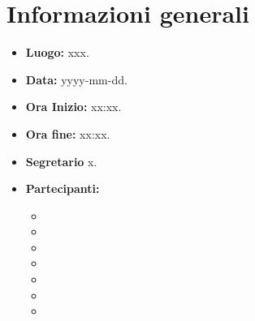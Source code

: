 \section{Informazioni generali}
	\begin{itemize}
		\item \textbf{Luogo:} xxx.
		\item \textbf{Data:} yyyy-mm-dd.
		\item \textbf{Ora Inizio:} xx:xx.
		\item \textbf{Ora fine:} xx:xx.
		\item \textbf{Segretario} x.
		\item \textbf{Partecipanti:}
		\begin{itemize}
			\item \MB
			\item \VAS
			\item \FD
			\item \NM
			\item \SB
			\item \GB
			\item \MDI
		\end{itemize}
		
	\end{itemize}